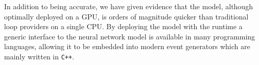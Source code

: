 \documentclass[main.tex]{subfiles}
\begin{document}
In addition to being accurate, we have given evidence that the model,
although optimally deployed on a GPU, is orders of magnitude quicker
than traditional loop providers on a single CPU. By deploying the model
with the {\ONNX} runtime a generic interface to the neural network model
is available in many programming languages, allowing it to be embedded
into modern event generators which are mainly written in \texttt{C++}.
\end{document}
